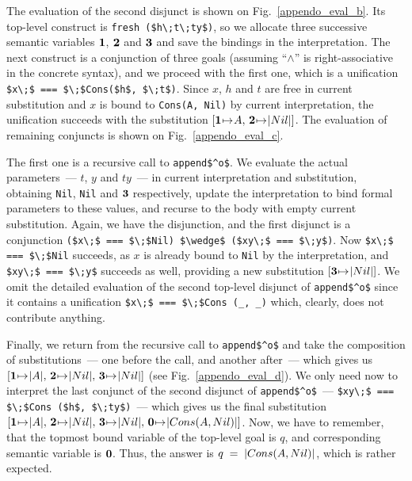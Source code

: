 The evaluation of the second disjunct is shown on Fig.~\ref{appendo_eval_b}. Its top-level construct is \lstinline|fresh ($h\;t\;ty$)|, so we allocate three successive 
semantic variables $\mbox{\textbf{1}}$, $\mbox{\textbf{2}}$ and $\mbox{\textbf{3}}$ and save the bindings in the interpretation. The next construct is a conjunction of three goals (assuming
``$\wedge$'' is right-associative in the concrete syntax), and we proceed with the first one, which is a unification \mbox{\lstinline|$x\;$ === $\;$Cons($h$, $\;t$)|}. 
Since $x$, $h$ and $t$ are free in current substitution and $x$ is bound to \lstinline|Cons(A, Nil)| by current interpretation, the unification succeeds with the 
substitution \mbox{$[\bnd{\sv{1}}{\lstinline{A}},\,\bnd{\sv{2}}{\lstinline|Nil|}]$}. The evaluation of remaining conjuncts is shown on Fig.~\ref{appendo_eval_c}.

\FloatBarrier
The first one is a recursive call to \lstinline|append$^o$|. We evaluate the actual parameters~--- $t$, $y$ and $ty$~--- in current interpretation and substitution, 
obtaining \lstinline|Nil|, \lstinline|Nil| and $\mbox{\textbf{3}}$ respectively, update the interpretation to bind formal parameters to these values, and recurse to the body with
empty current substitution. Again, we have the disjunction, and the first disjunct is a conjunction \mbox{\lstinline|($x\;$ === $\;$Nil) $\wedge$ ($xy\;$ === $\;y$)|}.
Now \mbox{\lstinline|$x\;$ === $\;$Nil|} succeeds, as $x$ is already bound to \lstinline|Nil| by the interpretation, and \mbox{\lstinline|$xy\;$ === $\;y$|} succeeds
as well, providing a new substitution \mbox{$[\bnd{\sv{3}}{\lstinline|Nil|}]$}. We omit the detailed evaluation of the second top-level disjunct of \lstinline|append$^o$| since
it contains a unification \lstinline|$x\;$ === $\;$Cons (_, _)| which, clearly, does not contribute anything.

Finally, we return from the recursive call to \lstinline|append$^o$| and take the composition of substitutions~--- one before the call, and another after~--- which
gives us \mbox{$[\bnd{\sv{1}}{\lstinline|A|},\,\bnd{\sv{2}}{\lstinline|Nil|},\,\bnd{\sv{3}}{\lstinline|Nil|}]$} (see Fig.~\ref{appendo_eval_d}). We only need now to 
interpret the last conjunct of the second disjunct of \lstinline|append$^o$|~--- \mbox{\lstinline|$xy\;$ === $\;$Cons ($h$, $\;ty$)|}~--- which gives us the
final substitution \mbox{$[\bnd{\sv{1}}{\lstinline|A|},\,\bnd{\sv{2}}{\lstinline|Nil|},\,\bnd{\sv{3}}{\lstinline|Nil|},\,\bnd{\sv{0}}{\lstinline|Cons (A, Nil)|}]$}. Now, we
have to remember, that the topmost bound variable of the top-level goal is $q$, and corresponding semantic variable is $\mbox{\textbf{0}}$. Thus, the answer is 
\mbox{$q\;=\;\lstinline|Cons (A, Nil)|$}, which is rather expected.




